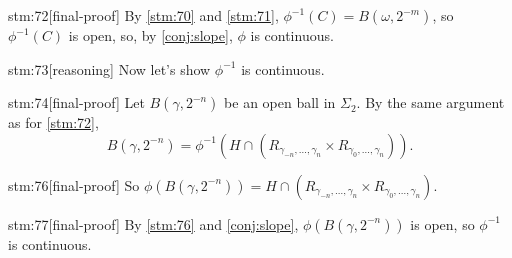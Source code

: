 \begin{stm}{stm:72}[final-proof]
By \ref{stm:70} and \ref{stm:71}, $\phi^{-1}(C) = B(\omega, 2^{-m})$, so $\phi^{-1}(C)$ is open, so, by \ref{conj:slope}, $\phi$ is continuous.
\end{stm}

\begin{stm}{stm:73}[reasoning]
Now let’s show $\phi^{-1}$ is continuous.
\end{stm}

\begin{stm}{stm:74}[final-proof]
Let $B(\gamma, 2^{-n})$ be an open ball in $\Sigma_2$. By the same argument as for \ref{stm:72},
\[
B(\gamma, 2^{-n}) = \phi^{-1}(H \cap (R_{\gamma_{-n}, \ldots, \gamma_n} \times R_{\gamma_0, \ldots, \gamma_n})).
\]
\end{stm}

\begin{stm}{stm:76}[final-proof]
So $\phi(B(\gamma, 2^{-n})) = H \cap (R_{\gamma_{-n}, \ldots, \gamma_n} \times R_{\gamma_0, \ldots, \gamma_n})$.
\end{stm}

\begin{stm}{stm:77}[final-proof]
By \ref{stm:76} and \ref{conj:slope}, $\phi(B(\gamma, 2^{-n}))$ is open, so $\phi^{-1}$ is continuous.
\end{stm}
